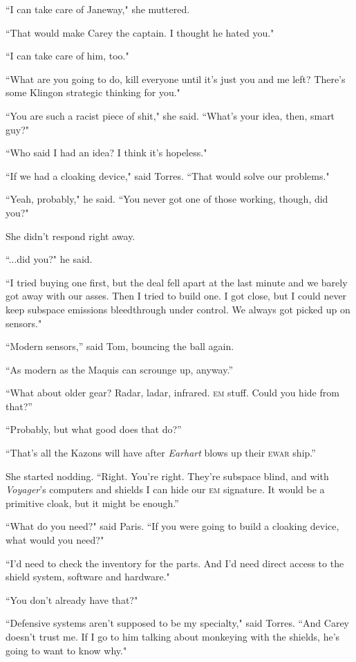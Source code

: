 \documentclass[twoside,letterpaper,12pt]{memoir}
\begin{document}
``I can take care of Janeway," she muttered. 

``That would make Carey the captain. I thought he hated you." 

``I can take care of him, too." 

``What are you going to do, kill everyone until it's just you and me left? There's some Klingon strategic thinking for you." 

``You are such a racist piece of shit," she said. ``What's your idea, then, smart guy?" 

``Who said I had an idea? I think it's hopeless." 

``If we had a cloaking device," said Torres. ``That would solve our problems." 

``Yeah, probably," he said. ``You never got one of those working, though, did you?" 

She didn't respond right away. 

``...did you?" he said. 

``I tried buying one first, but the deal fell apart at the last minute and we barely got away with our asses. Then I tried to build one. I got close, but I could never keep subspace emissions bleedthrough under control. We always got picked up on sensors." 

``Modern sensors,” said Tom, bouncing the ball again. 

``As modern as the Maquis can scrounge up, anyway.” 

``What about older gear? Radar, ladar, infrared. \textsc{em} stuff. Could you hide from that?” 

``Probably, but what good does that do?” 

``That’s all the Kazons will have after \textit{Earhart} blows up their \textsc{ewar} ship.” 

She started nodding. ``Right. You’re right. They’re subspace blind, and with \textit{Voyager}’s computers and shields I can hide our \textsc{em} signature. It would be a primitive cloak, but it might be enough.” 

``What do you need?" said Paris. ``If you were going to build a cloaking device, what would you need?" 

``I'd need to check the inventory for the parts. And I'd need direct access to the shield system, software and hardware." 

``You don't already have that?" 

``Defensive systems aren't supposed to be my specialty," said Torres. ``And Carey doesn't trust me. If I go to him talking about monkeying with the shields, he's going to want to know why." 
\end{document}

